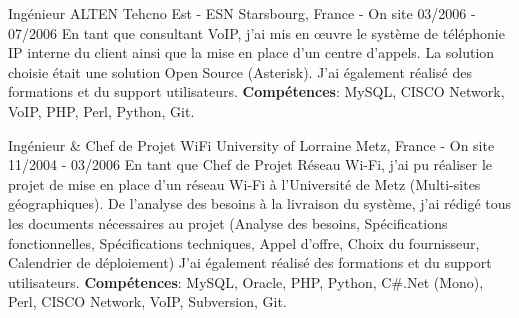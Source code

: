 \begin{cventries}
  \cventry
    {Ingénieur} %
    {ALTEN Tehcno Est - ESN} %
    {Starsbourg, France - On site} %
    {03/2006 - 07/2006} %
    {
      En tant que consultant VoIP, j'ai mis en œuvre le système de téléphonie IP 
      interne du client ainsi que la mise en place d'un centre d'appels. La solution 
      choisie était une solution Open Source (Asterisk).
      \newline
      J'ai également réalisé des formations et du support utilisateurs.
      \newline
      \textbf{Compétences}: MySQL, CISCO Network, VoIP, PHP, Perl, Python, Git.
    }

  \cventry
    {Ingénieur \& Chef de Projet WiFi} %
    {University of Lorraine} %
    {Metz, France - On site} %
    {11/2004 - 03/2006} %
    {
      En tant que Chef de Projet Réseau Wi-Fi, j'ai pu réaliser le projet de mise en place 
      d'un réseau Wi-Fi à l'Université de Metz (Multi-sites géographiques).
      \newline
      De l'analyse des besoins à la livraison du système, j'ai rédigé tous les documents 
      nécessaires au projet (Analyse des besoins, Spécifications fonctionnelles, Spécifications 
      techniques, Appel d'offre, Choix du fournisseur, Calendrier de déploiement)
      \newline
      J'ai également réalisé des formations et du support utilisateurs.
      \newline
      \textbf{Compétences}: MySQL, Oracle, PHP, Python, C\#.Net (Mono), Perl, CISCO Network, VoIP, Subversion, Git.
    }

\end{cventries}